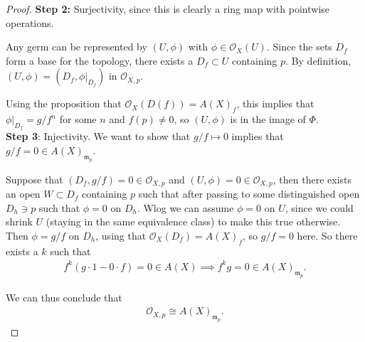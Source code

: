 \begin{proof}
\textbf{Step 2:} Surjectivity, since this is clearly a ring map with
pointwise operations.

Any germ can be represented by \((U, \phi)\) with
\(\phi \in {\mathcal{O}}_X(U)\). Since the sets \(D_f\) form a base for
the topology, there exists a \(D_f\subset U\) containing \(p\). By
definition, \((U, \phi) = (D_f, { \left.{{\phi}} \right|_{{D_f}} })\) in
\({\mathcal{O}}_{X, p}\).

Using the proposition that \({\mathcal{O}}_X(D(f)) = A(X)_f\), this
implies that \({ \left.{{\phi}} \right|_{{D_f}} } = g/f^n\) for some
\(n\) and \(f(p) \neq 0\), so \((U, \phi)\) is in the image of
\(\Phi\).\\

\textbf{Step 3}: Injectivity. We want to show that \(g/f\mapsto 0\)
implies that \(g/f = 0 \in A(X)_{{\mathfrak{m}}_p}\).

Suppose that \((D_f, g/f) = 0 \in {\mathcal{O}}_{X, p}\) and
\((U, \phi) = 0 \in {\mathcal{O}}_{X,p}\), then there exists an open
\(W\subset D_f\) containing \(p\) such that after passing to some
distinguished open \(D_h\ni p\) such that \(\phi = 0\) on \(D_h\). Wlog
we can assume \(\phi = 0\) on \(U\), since we could shrink \(U\)
(staying in the same equivalence class) to make this true otherwise.
Then \(\phi = g/f\) on \(D_h\), using that
\({\mathcal{O}}_X(D_f) = A(X)_f\), so \(g/f = 0\) here. So there exists
a \(k\) such that
\begin{align*}  
f^k(g\cdot 1 - 0\cdot f) = 0 \in A(X) \implies f^k g=0 \in A(X)_{{\mathfrak{m}}_p}
.\end{align*}

We can thus conclude that
\begin{align*}  
{\mathcal{O}}_{X, p} \cong A(X)_{{\mathfrak{m}}_p}
.\end{align*}

\end{proof}

